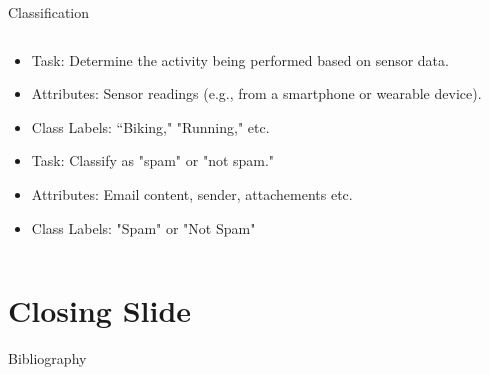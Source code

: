 \documentclass[aspectratio=169]{beamer}
\begin{document}
\begin{frame}{Classification}
\begin{columns}
\begin{column}{0.32\textwidth}
        \begin{coloredblock}
            \begin{itemize}
                \item \scriptsize Task: Determine the activity being performed based on sensor data.
                \item \scriptsize Attributes: Sensor readings (e.g., from a smartphone or wearable device).
                \item \scriptsize Class Labels: “Biking," "Running," etc.
            \end{itemize}
        \end{coloredblock}
        \vspace{0.3cm}
        \begin{coloredblock}
            \begin{itemize}
                \item \scriptsize Task: Classify as "spam" or "not spam."
                \item \scriptsize Attributes: Email content, sender, attachements etc.
                \item \scriptsize Class Labels: "Spam" or "Not Spam"
            \end{itemize}
        \end{coloredblock}
        
        \end{column}
    \end{columns}

\end{frame}


\section*{Closing Slide}

\begin{frame}
    \label{frame:closing_slide}

\end{frame}


\begin{frame}[allowframebreaks]{Bibliography}
  \printbibliography
\end{frame}
\end{document}
